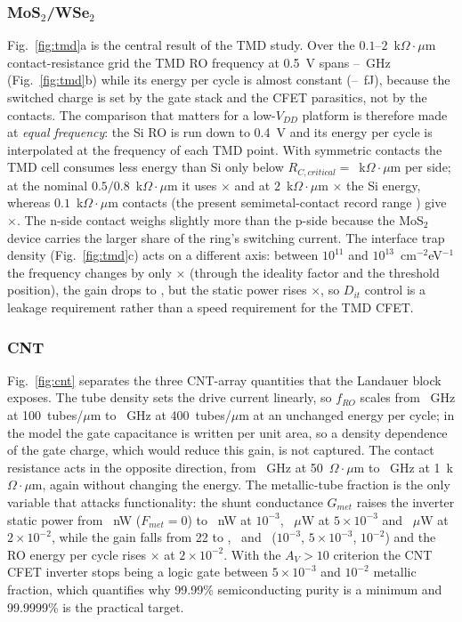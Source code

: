 \documentclass[journal]{IEEEtran}
\begin{document}
\subsubsection{MoS$_2$/WSe$_2$}
Fig.~\ref{fig:tmd}a is the central result of the TMD study. Over the $0.1$--$2$~k$\Omega\cdot\mu$m contact-resistance grid the TMD RO frequency at 0.5~V spans \tmdFlo--\tmdFhi~GHz (Fig.~\ref{fig:tmd}b) while its energy per cycle is almost constant (\tmdElo--\tmdEhi~fJ), because the switched charge is set by the gate stack and the CFET parasitics, not by the contacts. The comparison that matters for a low-$V_{DD}$ platform is therefore made at \emph{equal frequency}: the Si RO is run down to 0.4~V and its energy per cycle is interpolated at the frequency of each TMD point. With symmetric contacts the TMD cell consumes less energy than Si only below $R_{C,critical}=$\rcCritical~k$\Omega\cdot\mu$m per side; at the nominal $0.5/0.8$~k$\Omega\cdot\mu$m it uses \tmdRatioZeropFive$\times$ and at $2$~k$\Omega\cdot\mu$m \tmdRatioTwopZero$\times$ the Si energy, whereas $0.1$~k$\Omega\cdot\mu$m contacts (the present semimetal-contact record range \cite{Shen2021,Li2023Nature}) give \tmdRatioZeropOne$\times$. The n-side contact weighs slightly more than the p-side because the MoS$_2$ device carries the larger share of the ring's switching current. The interface trap density (Fig.~\ref{fig:tmd}c) acts on a different axis: between $10^{11}$ and $10^{13}$~cm$^{-2}$eV$^{-1}$ the frequency changes by only \ditFratio$\times$ (through the ideality factor and the threshold position), the gain drops to \ditGainLo, but the static power rises \ditPstatRatio$\times$, so $D_{it}$ control is a leakage requirement rather than a speed requirement for the TMD CFET.
\subsubsection{CNT}
Fig.~\ref{fig:cnt} separates the three CNT-array quantities that the Landauer block exposes. The tube density sets the drive current linearly, so $f_{RO}$ scales from \cntFdlo~GHz at 100~tubes/$\mu$m to \cntFdhi~GHz at 400~tubes/$\mu$m at an unchanged energy per cycle; in the model the gate capacitance is written per unit area, so a density dependence of the gate charge, which would reduce this gain, is not captured. The contact resistance acts in the opposite direction, from \cntFrcLo~GHz at 50~$\Omega\cdot\mu$m to \cntFrcHi~GHz at 1~k$\Omega\cdot\mu$m, again without changing the energy. The metallic-tube fraction is the only variable that attacks functionality: the shunt conductance $G_{met}$ raises the inverter static power from \fmetPzero~nW ($F_{met}=0$) to \fmetPmilli~nW at $10^{-3}$, \fmetPhalf~$\mu$W at $5\times10^{-3}$ and \fmetPtwo~$\mu$W at $2\times10^{-2}$, while the gain falls from 22 to \fmetGainMilli, \fmetGainHalf\ and \fmetGainOne\ ($10^{-3}$, $5\times10^{-3}$, $10^{-2}$) and the RO energy per cycle rises \fmetEtwo$\times$ at $2\times10^{-2}$. With the $A_V>10$ criterion the CNT CFET inverter stops being a logic gate between $5\times10^{-3}$ and $10^{-2}$ metallic fraction, which quantifies why 99.99\% semiconducting purity is a minimum and 99.9999\% \cite{Liu2020Science} is the practical target.
\end{document}
